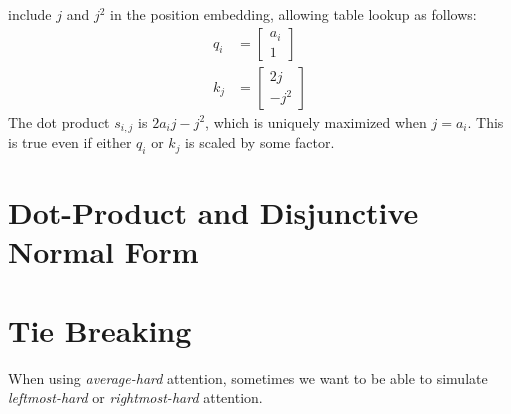  include $j$ and $j^2$ in the position embedding, allowing table lookup as follows:
\begin{align*}
  q_i &= \begin{bmatrix} a_i \\ 1 \end{bmatrix} \\
  k_j &= \begin{bmatrix} 2j \\ -j^2 \end{bmatrix}
\end{align*}
The dot product $s_{i,j}$ is $2a_ij - j^2$, which is uniquely maximized when $j=a_i$.
This is true even if either $q_i$ or $k_j$ is scaled by some factor.

\iffalse
\subsection{$-|\text{Dot-product}|$ attention}

\citep{perez-etal-2021-turing}
\fi

\section{Dot-Product and Disjunctive Normal Form}
\label{sec:att_dnf}

\section{Tie Breaking}

When using \emph{average-hard} attention, sometimes we want to be able to simulate \emph{leftmost-hard} or \emph{rightmost-hard} attention.

